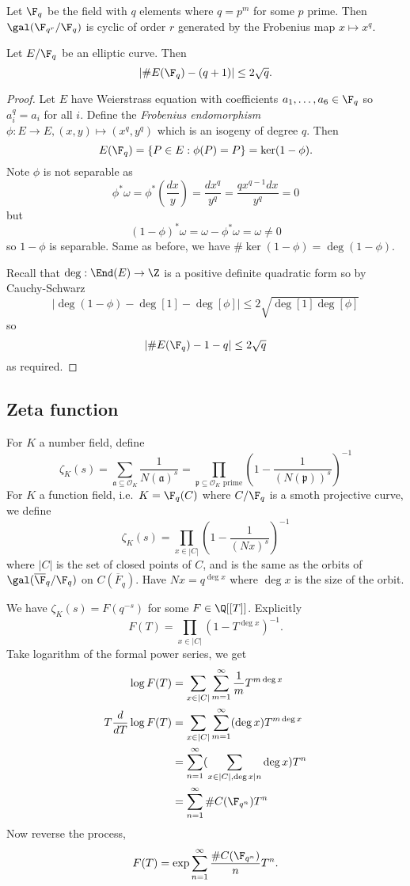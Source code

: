 \documentclass[a4paper]{article}
\theoremstyle{definition}
\theoremstyle{theorem}
\renewcommand*{\O}{\mathcal{O}}
\begin{document}
Let \(\F_q\) be the field with \(q\) elements where \(q = p^m\) for some \(p\) prime. Then \(\gal(\F_{q^r}/\F_q)\) is cyclic of order \(r\) generated by the Frobenius map \(x \mapsto x^q\).

\begin{theorem}[Hasse]
  Let \(E/\F_q\) be an elliptic curve. Then
  \[
    |\#E(\F_q) - (q + 1)| \leq 2 \sqrt q.
  \]
\end{theorem}

\begin{proof}
  Let \(E\) have Weierstrass equation with coefficients \(a_1, \dots, a_6 \in \F_q\) so \(a_i^q = a_i\) for all \(i\). Define the \emph{Frobenius endomorphism} \(\phi: E \to E, (x, y) \mapsto (x^q, y^q)\) which is an isogeny of degree \(q\). Then
  \[
    E(\F_q) = \{P \in E: \phi(P) = P\} = \ker (1 - \phi).
  \]
  Note \(\phi\) is not separable as
  \[
    \phi^*\omega = \phi^* (\frac{dx}{y}) = \frac{d x^q}{y^q} = \frac{qx^{q - 1} dx}{y^q} = 0
  \]
  but
  \[
    (1 - \phi)^* \omega = \omega - \phi^* \omega = \omega \ne 0
  \]
  so \(1 - \phi\) is separable. Same as before, we have \(\# \ker (1 - \phi) = \deg (1 - \phi)\).

  Recall that \(\deg: \End(E) \to \Z\) is a positive definite quadratic form so by Cauchy-Schwarz
  \[
    |\deg (1 - \phi) - \deg [1] - \deg [\phi]| \leq 2 \sqrt{\deg [1] \deg [\phi]}
  \]
  so
  \[
    |\#E(\F_q) - 1 - q| \leq 2 \sqrt q
  \]
  as required.
\end{proof}

\subsection{Zeta function}

For \(K\) a number field, define
\[
  \zeta_K(s) = \sum_{\mathfrak a \subseteq \O_K} \frac{1}{N(\mathfrak a)^s} = \prod_{\mathfrak p \subseteq \O_K \text{ prime}} \left( 1- \frac{1}{(N(\mathfrak p))^s} \right)^{-1}
\]
For \(K\) a function field, i.e.\ \(K = \F_q(C)\) where \(C/\F_q\) is a smoth projective curve, we define
\[
  \zeta_K(s) = \prod_{x \in |C|} \left(1 - \frac{1}{(Nx)^s} \right)^{-1}
\]
where \(|C|\) is the set of closed points of \(C\), and is the same as the orbits of \(\gal(\overline \F_q/\F_q)\) on \(C(\overline F_q)\). Have \(Nx = q^{\deg x}\) where \(\deg x\) is the size of the orbit.

We have \(\zeta_K(s) = F(q^{-s})\) for some \(F \in \Q[[T]]\). Explicitly
\[
  F(T) = \prod_{x \in |C|} (1 - T^{\deg x})^{-1}.
\]
Take logarithm of the formal power series, we get
\begin{align*}
  \log F(T) &= \sum_{x \in |C|} \sum_{m = 1}^\infty \frac{1}{m} T^{m \deg x} \\
  T \frac{d}{dT} \log F(T) &= \sum_{x \in |C|} \sum_{m = 1}^\infty (\deg x) T^{m \deg x} \\
            &= \sum_{n = 1}^\infty (\sum_{x \in |C|, \deg x|n} \deg x) T^n \\
            &= \sum_{n = 1}^\infty \# C(\F_{q^n}) T^n
\end{align*}
Now reverse the process,
\[
  F(T) = \exp \sum_{n = 1}^\infty \frac{\# C(\F_{q^n})}{n} T^n.
\]
\end{document}
